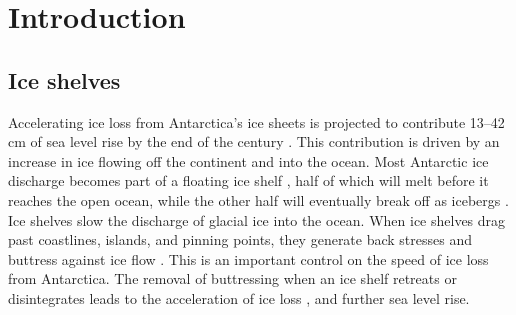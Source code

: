 \section{Introduction} \label{sec:data_intro}

\subsection{Ice shelves}


Accelerating ice loss from Antarctica's ice sheets is projected to contribute 13--42 cm of sea level rise by the end of the century \citep{edwards2021projected}.
This contribution is driven by an increase in ice flowing off the continent and into the ocean. Most Antarctic ice discharge becomes part of a floating ice shelf \citep{rignot2013ice}, half of which will melt before it reaches the open ocean, while the other half will eventually break off as icebergs \citep{rignot2013ice,liu2015ocean}. 
Ice shelves slow the discharge of glacial ice into the ocean. When ice shelves drag past coastlines, islands, and pinning points, they generate back stresses and buttress against ice flow \cite [e.g.][] {dupont2005assessment, furst2016safety}.  This is an important control on the speed of ice loss from Antarctica.  The removal of buttressing when an ice shelf retreats or disintegrates leads to the acceleration of ice loss \citep{rignot2004accelerated, berthier2012mass}, and further sea level rise.


